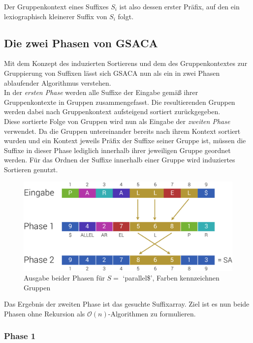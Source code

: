 \documentclass[twoside,a4paper,11pt]{article}
\theoremstyle{break}
\begin{document}
Der Gruppenkontext eines Suffixes $S_i$ ist also dessen erster Präfix, auf den ein lexiographisch kleinerer Suffix von $S_i$ folgt.

\subsection{Die zwei Phasen von GSACA}

Mit dem Konzept des induzierten Sortierens und dem des Gruppenkontextes zur Gruppierung von Suffixen lässt sich GSACA nun als ein in zwei Phasen ablaufender Algorithmus verstehen. \\

In der \textit{ersten Phase} werden alle Suffixe der Eingabe gemäß ihrer Gruppenkontexte in Gruppen zusammengefasst. Die resultierenden Gruppen werden dabei nach Gruppenkontext aufsteigend sortiert zurückgegeben. \\

Diese sortierte Folge von Gruppen wird nun als Eingabe der \textit{zweiten Phase} verwendet. Da die Gruppen untereinander bereits nach ihrem Kontext sortiert wurden und ein Kontext jeweils Präfix der Suffixe seiner Gruppe ist, müssen die Suffixe in dieser Phase lediglich innerhalb ihrer jeweiligen Gruppe geordnet werden. Für das Ordnen der Suffixe innerhalb einer Gruppe wird induziertes Sortieren genutzt.

\begin{figure}[h]
	\centering
	\includegraphics[width=0.7\linewidth,bb=0 0 874 376]{./assets/twoPhases.pdf}
	\caption{Ausgabe beider Phasen für $S =$ `parallel\$', Farben kennzeichnen Gruppen}
\label{fig:twoPhases}
\end{figure}

Das Ergebnis der zweiten Phase ist das gesuchte Suffixarray. Ziel ist es nun beide Phasen ohne Rekursion als $\mathcal{O}(n)$-Algorithmen zu formulieren.

\subsubsection{Phase 1}
\end{document}
